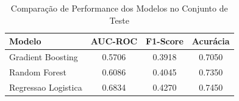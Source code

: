\begin{table}[htbp]
\centering
\caption{Comparação de Performance dos Modelos no Conjunto de Teste}
\label{tab:comparacao}
\small
\begin{tabular}{lccc}
\toprule
\textbf{Modelo} & \textbf{AUC-ROC} & \textbf{F1-Score} & \textbf{Acurácia} \\
\midrule
Gradient Boosting & 0.5706 & 0.3918 & 0.7050 \\
Random Forest & 0.6086 & 0.4045 & 0.7350 \\
Regressao Logistica & 0.6834 & 0.4270 & 0.7450 \\
\bottomrule
\end{tabular}
\vspace{2mm}
\end{table}